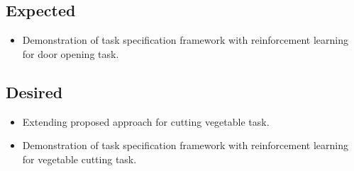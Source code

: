 \documentclass[thesis]{mas_proposal}
\begin{document}
\subsection{Expected}
\begin{itemize}
    \item Demonstration of task specification framework with reinforcement learning for door opening task.
\end{itemize}

\subsection{Desired}
\begin{itemize}
	\item Extending proposed approach for cutting vegetable task.
    \item Demonstration of task specification framework with reinforcement learning for vegetable cutting task.
\end{itemize}


\nocite{*}

\end{document}
